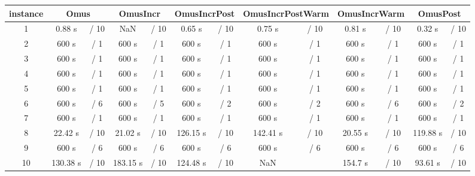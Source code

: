 \begin{table}[h!]
    \begin{tabular}{c|cc|cc|cc|cc|cc|cc|}
        instance & \multicolumn{2}{|c|}{Omus} &      \multicolumn{2}{|c|}{OmusIncr}  &  \multicolumn{2}{|c|}{OmusIncrPost} & \multicolumn{2}{|c|}{OmusIncrPostWarm} &  \multicolumn{2}{|c|}{OmusIncrWarm} &       \multicolumn{2}{|c|}{OmusPost} \\
        \hline
        1 &    0.88 s & / 10 &            NaN & / 10     & 0.65 s & / 10 &      0.75 s & / 10 &   0.81 s & / 10 &    0.32 s & / 10 \\
        2            &      600 s & / 1 &   600 s & / 1 &      600 s & / 1 &        600 s & / 1 &     600 s & / 1 &      600 s & / 1 \\
        3          &      600 s & / 1 &      600 s & / 1 &      600 s & / 1 &        600 s & / 1 &     600 s & / 1 &      600 s & / 1 \\
        4         &      600 s & / 1 &      600 s & / 1 &     600 s & / 1 &        600 s & / 1 &     600 s & / 1 &    600 s & / 1 \\
5                 &      600 s & / 1 &      600 s & / 1 &      600 s & / 1 &        600 s & / 1 &     600 s & / 1 &      600 s & / 1 \\
 6                  &      600 s & / 6 &      600 s & / 5 &      600 s & / 2 &        600 s & / 2 &     600 s & / 6 &      600 s & / 2 \\
  7               &      600 s & / 1 &      600 s & / 1 &      600 s & / 1 &        600 s & / 1 &     600 s & / 1 &      600 s & / 1 \\
   8                 &   22.42 s & / 10 &   21.02 s & / 10 &  126.15 s & / 10 &    142.41 s & / 10 &  20.55 s & / 10 &  119.88 s & / 10 \\
    9                &      600 s & / 6 &      600 s & / 6 &   600 s & / 6 &     600 s & / 6 &  600 s & / 6 &   600 s & / 6 \\
     10     &  130.38 s & / 10 &  183.15 s & / 10 &  124.48 s & / 10 &              NaN &  &  154.7 s & / 10 &   93.61 s & / 10 \\
        \end{tabular}
\end{table}

